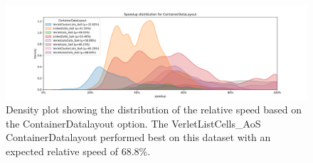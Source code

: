 \begin{figure}[H]
  \centering
  \includegraphics[width=\columnwidth,trim={1cm 0 2cm 1.5cm},clip]{figures/DataAnalytics/speedup_ContainerDataLayout.png}
  \caption[Speedup density plot of Configuration-Datalayout option]{Density plot showing the distribution of the relative speed based on the ContainerDatalayout option. The VerletListCells\_AoS ContainerDatalayout performed best on this dataset with an expected relative speed of 68.8\%.}
  \label{fig:inputAnalysisDensityDatalayout}
\end{figure}